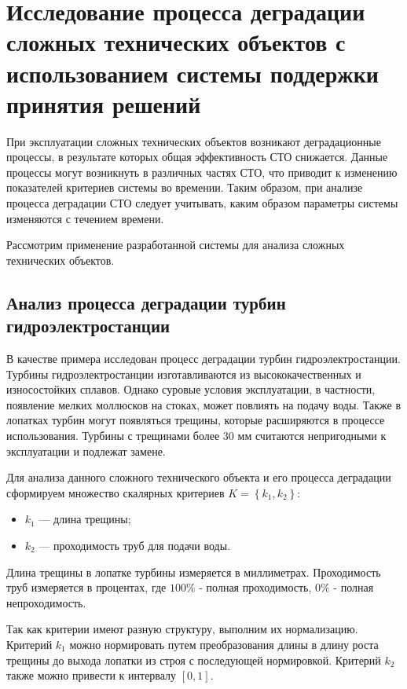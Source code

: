 \section{Исследование процесса деградации сложных технических объектов с использованием системы поддержки принятия решений}

При эксплуатации сложных технических объектов возникают деградационные процессы,
в результате которых общая эффективность СТО снижается.
Данные процессы могут возникнуть в различных частях СТО, что приводит к изменению показателей критериев системы во времении.
Таким образом, при анализе процесса деградации СТО следует учитывать, каким образом параметры системы изменяются с течением времени.

Рассмотрим применение разработанной системы для анализа сложных технических объектов.

\subsection{Анализ процесса деградации турбин гидроэлектростанции}
В качестве примера исследован процесс деградации турбин гидроэлектростанции.
Турбины гидроэлектростанции изготавливаются из высококачественных и износостойких сплавов.
Однако суровые условия эксплуатации, в частности, появление мелких моллюсков на стоках, может повлиять на подачу воды.
Также в лопатках турбин могут появляться трещины, которые расширяются в процессе использования.
Турбины с трещинами более 30 мм считаются непригодными к эксплуатации и подлежат замене.

Для анализа данного сложного технического объекта и его процесса деградации сформируем множество скалярных критериев $K=\left\{k_1,k_2\right\}$:
\begin{itemize}
    \item $k_1$ --- длина трещины;
    \item $k_2$ --- проходимость труб для подачи воды.
\end{itemize}

Длина трещины в лопатке турбины измеряется в миллиметрах.
Проходимость труб измеряется в процентах, где $100\%$ - полная проходимость, $0\%$ - полная непроходимость.

Так как критерии имеют разную структуру, выполним их нормализацию. 
Критерий $k_1$ можно нормировать путем преобразования длины в длину роста трещины до выхода лопатки из строя с последующей нормировкой.
Критерий $k_2$ также можно привести к интервалу $[0,1]$.

